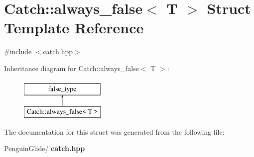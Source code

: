 \section{Catch\+::always\+\_\+false$<$ T $>$ Struct Template Reference}
\label{struct_catch_1_1always__false}


{\ttfamily \#include $<$catch.\+hpp$>$}

Inheritance diagram for Catch\+::always\+\_\+false$<$ T $>$\+:\begin{figure}[H]
\begin{center}
\leavevmode
\includegraphics[height=2.000000cm]{struct_catch_1_1always__false}
\end{center}
\end{figure}


The documentation for this struct was generated from the following file\+:\begin{DoxyCompactItemize}
\item 
Penguin\+Glide/\textbf{ catch.\+hpp}\end{DoxyCompactItemize}
